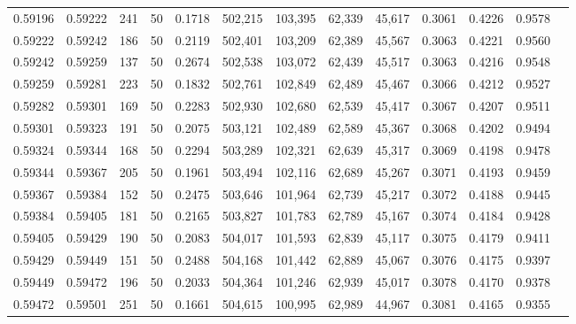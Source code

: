 \begin{tabular}{rrrrrrrrrrrrr}
0.59196 & 0.59222 &   241 &  50 &                                     0.1718 & 502,215 & 103,395 &  62,339 &  45,617 & 0.3061 & 0.4226 & 0.9578 \\
0.59222 & 0.59242 &   186 &  50 &                                     0.2119 & 502,401 & 103,209 &  62,389 &  45,567 & 0.3063 & 0.4221 & 0.9560 \\
0.59242 & 0.59259 &   137 &  50 &                                     0.2674 & 502,538 & 103,072 &  62,439 &  45,517 & 0.3063 & 0.4216 & 0.9548 \\
0.59259 & 0.59281 &   223 &  50 &                                     0.1832 & 502,761 & 102,849 &  62,489 &  45,467 & 0.3066 & 0.4212 & 0.9527 \\
0.59282 & 0.59301 &   169 &  50 &                                     0.2283 & 502,930 & 102,680 &  62,539 &  45,417 & 0.3067 & 0.4207 & 0.9511 \\
0.59301 & 0.59323 &   191 &  50 &                                     0.2075 & 503,121 & 102,489 &  62,589 &  45,367 & 0.3068 & 0.4202 & 0.9494 \\
0.59324 & 0.59344 &   168 &  50 &                                     0.2294 & 503,289 & 102,321 &  62,639 &  45,317 & 0.3069 & 0.4198 & 0.9478 \\
0.59344 & 0.59367 &   205 &  50 &                                     0.1961 & 503,494 & 102,116 &  62,689 &  45,267 & 0.3071 & 0.4193 & 0.9459 \\
0.59367 & 0.59384 &   152 &  50 &                                     0.2475 & 503,646 & 101,964 &  62,739 &  45,217 & 0.3072 & 0.4188 & 0.9445 \\
0.59384 & 0.59405 &   181 &  50 &                                     0.2165 & 503,827 & 101,783 &  62,789 &  45,167 & 0.3074 & 0.4184 & 0.9428 \\
0.59405 & 0.59429 &   190 &  50 &                                     0.2083 & 504,017 & 101,593 &  62,839 &  45,117 & 0.3075 & 0.4179 & 0.9411 \\
0.59429 & 0.59449 &   151 &  50 &                                     0.2488 & 504,168 & 101,442 &  62,889 &  45,067 & 0.3076 & 0.4175 & 0.9397 \\
0.59449 & 0.59472 &   196 &  50 &                                     0.2033 & 504,364 & 101,246 &  62,939 &  45,017 & 0.3078 & 0.4170 & 0.9378 \\
0.59472 & 0.59501 &   251 &  50 &                                     0.1661 & 504,615 & 100,995 &  62,989 &  44,967 & 0.3081 & 0.4165 & 0.9355 \\

\end{tabular}
